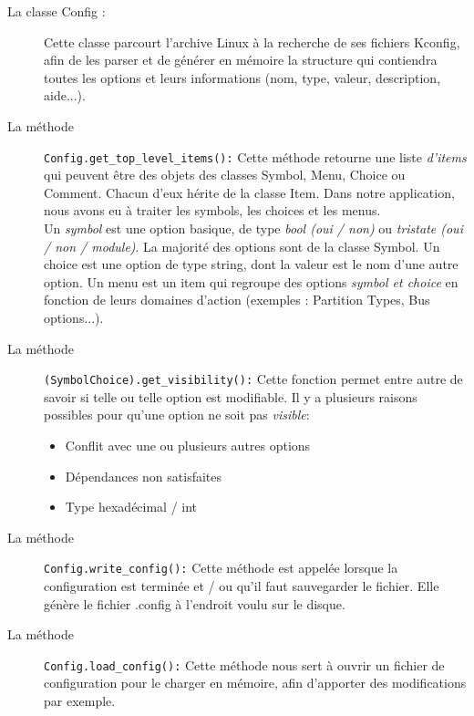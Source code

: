 \documentclass[17pts]{report}
\begin{document}
\begin{description}
    \item[La classe Config :] Cette classe parcourt l'archive Linux à la
        recherche de ses fichiers Kconfig, afin de les parser et de générer en
        mémoire la structure qui contiendra toutes les options et leurs
        informations (nom, type, valeur, description, aide...).
    \item[La méthode ] \verb|Config.get_top_level_items():| Cette méthode
        retourne une liste \textit{d'items} qui peuvent être des objets des
        classes Symbol, Menu, Choice ou Comment. Chacun d'eux hérite de la
        classe Item.  Dans notre application, nous avons eu à traiter les
        symbols, les choices et les menus.\\

        Un \textit{symbol} est une option basique, de type \textit{bool (oui /
        non)} ou \textit{tristate (oui / non / module)}. La majorité des
        options sont de la classe Symbol.  Un choice est une option de type
        string, dont la valeur est le nom d'une autre option.  Un menu est un
        item qui regroupe des options \textit{symbol et choice} en fonction de
        leurs domaines d'action (exemples : Partition Types, Bus options...).
    \item[La méthode ] \verb|(Symbol|\verb|Choice).get_visibility():| Cette
        fonction permet entre autre de savoir si telle ou telle option est
        modifiable. Il y a plusieurs raisons possibles pour qu'une option ne
        soit pas \textit{visible}:
        \begin{itemize}
            \item Conflit avec une ou plusieurs autres options
            \item Dépendances non satisfaites
            \item Type hexadécimal / int \newline
        \end{itemize}
    \item[La méthode ] \verb|Config.write_config():| Cette méthode est appelée
        lorsque la configuration est terminée et / ou qu'il faut sauvegarder le
        fichier. Elle génère le fichier .config à l'endroit voulu sur le
        disque. \newline
    \item[La méthode ] \verb|Config.load_config():| Cette méthode nous sert à
        ouvrir un fichier de configuration pour le charger en mémoire, afin
        d'apporter des modifications par exemple.
\end{description}
\end{document}
